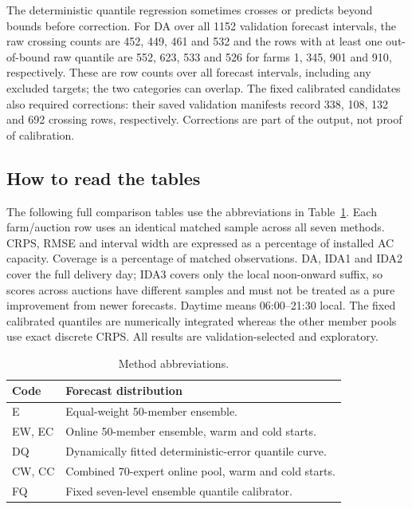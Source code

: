 \documentclass[11pt,a4paper]{article}
\begin{document}
The deterministic quantile regression sometimes crosses or predicts beyond bounds before correction. For DA over all 1152 validation forecast intervals, the raw crossing counts are 452, 449, 461 and 532 and the rows with at least one out-of-bound raw quantile are 552, 623, 533 and 526 for farms 1, 345, 901 and 910, respectively. These are row counts over all forecast intervals, including any excluded targets; the two categories can overlap. The fixed calibrated candidates also required corrections: their saved validation manifests record 338, 108, 132 and 692 crossing rows, respectively. Corrections are part of the output, not proof of calibration.

\subsection{How to read the tables}
The following full comparison tables use the abbreviations in Table~\ref{tab:methods}. Each farm/auction row uses an identical matched sample across all seven methods. CRPS, RMSE and interval width are expressed as a percentage of installed AC capacity. Coverage is a percentage of matched observations. DA, IDA1 and IDA2 cover the full delivery day; IDA3 covers only the local noon-onward suffix, so scores across auctions have different samples and must not be treated as a pure improvement from newer forecasts. Daytime means 06:00--21:30 local. The fixed calibrated quantiles are numerically integrated whereas the other member pools use exact discrete CRPS. All results are validation-selected and exploratory.
\begin{table}[H]\centering\small\begin{tabular}{lp{10.5cm}}\toprule
Code & Forecast distribution\\\midrule
E & Equal-weight 50-member ensemble.\\
EW, EC & Online 50-member ensemble, warm and cold starts.\\
DQ & Dynamically fitted deterministic-error quantile curve.\\
CW, CC & Combined 70-expert online pool, warm and cold starts.\\
FQ & Fixed seven-level ensemble quantile calibrator.\\
\bottomrule\end{tabular}\caption{Method abbreviations.}\label{tab:methods}\end{table}
\small
\end{document}
